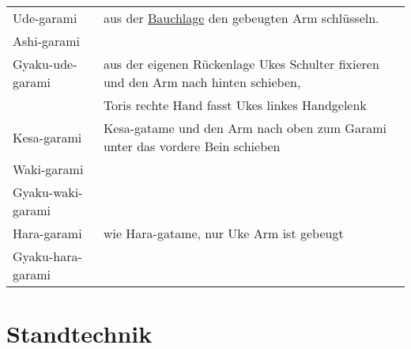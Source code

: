 \documentclass[justified, a4paper, notitlepage, captions=tableheading, nobib]{tufte-handout}
\begin{document}
\begin{center}
\begin{tabular}{ll}
\label{org17e995a}Ude-garami & aus der \hyperref[orgfae504a]{Bauchlage} den gebeugten Arm schlüsseln.\\
\label{org56feb7a}Ashi-garami & \\
\label{org468550f}Gyaku-ude-garami & aus der eigenen Rückenlage Ukes Schulter fixieren und den Arm nach hinten schieben,\\
 & Toris rechte Hand fasst Ukes linkes Handgelenk\\
\label{orgf43e8e7}Kesa-garami & Kesa-gatame und den Arm nach oben zum Garami unter das vordere Bein schieben\\
\label{orgb3a66da}Waki-garami & \\
\label{org771b39d}Gyaku-waki-garami & \\
\label{org828662e}Hara-garami & wie Hara-gatame, nur Uke Arm ist gebeugt\\
\label{org24dab60}Gyaku-hara-garami & \\
\end{tabular}
\end{center}

\newpage
\section{Standtechnik }
\label{sec:org45d6486}
\end{document}

